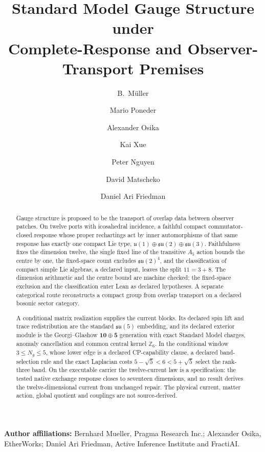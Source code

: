 \documentclass[11pt]{article}
\title{Standard Model Gauge Structure under\\
Complete-Response and Observer-Transport Premises}
\author{B.\ M\"uller \and Mario Poneder \and Alexander Osika \and Kai Xue
\and Peter Nguyen \and David Matscheko \and Daniel Ari Friedman}
\date{\OPHPaperReleaseDate}
\begin{document}
\maketitle
\OPHPaperReleaseBanner

\begin{center}
\small\textbf{Author affiliations:} Bernhard Mueller, Pragma Research Inc.; Alexander Osika, EtherWorks; Daniel Ari Friedman, Active Inference Institute and FractiAI.
\end{center}

\begin{abstract}
Gauge structure is proposed to be the transport of overlap data between
observer patches. On twelve ports with icosahedral incidence, a faithful
compact commutator-closed response whose proper rechartings act by inner
automorphisms of that same response has exactly one compact Lie type,
\(\mathfrak u(1)\oplus\mathfrak{su}(2)\oplus\mathfrak{su}(3)\).
Faithfulness fixes the dimension twelve, the single fixed line of the
transitive \(A_5\) action bounds the centre by one, the fixed-space count
excludes \(\mathfrak{su}(2)^4\), and the classification of compact simple
Lie algebras, a declared input, leaves the split \(11=3+8\). The dimension
arithmetic and the centre bound are machine checked; the fixed-space
exclusion and the classification enter Lean as declared hypotheses. A
separate categorical route reconstructs a compact group from overlap
transport on a declared bosonic sector category.

A conditional matrix realization supplies the current blocks. Its declared
spin lift and trace redistribution are the standard \(\mathfrak{su}(5)\)
embedding, and its declared exterior module is the Georgi--Glashow
\(\mathbf{10}\oplus\bar{\mathbf 5}\) generation with exact Standard Model
charges, anomaly cancellation and common central kernel \(\mathbb Z_6\).
In the conditional window \(3\le N_g\le5\), whose lower edge is a declared
CP-capability clause, a declared band-selection rule and the exact Laplacian
costs \(5-\sqrt5<6<5+\sqrt5\) select the rank-three band. On the executable
carrier the twelve-current law is a specification: the tested native
exchange response closes to seventeen dimensions, and no result derives the
twelve-dimensional current from unchanged repair. The physical current, matter
action, global quotient and couplings are not source-derived.
\end{abstract}




\end{document}
